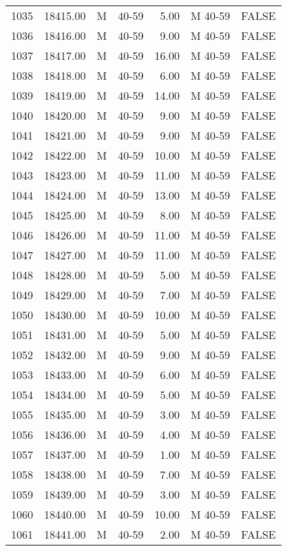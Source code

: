\begin{table}[ht]
\begin{tabular}{rrllrll}
  1035 & 18415.00 & M & 40-59 & 5.00 & M 40-59 & FALSE \\ 
  1036 & 18416.00 & M & 40-59 & 9.00 & M 40-59 & FALSE \\ 
  1037 & 18417.00 & M & 40-59 & 16.00 & M 40-59 & FALSE \\ 
  1038 & 18418.00 & M & 40-59 & 6.00 & M 40-59 & FALSE \\ 
  1039 & 18419.00 & M & 40-59 & 14.00 & M 40-59 & FALSE \\ 
  1040 & 18420.00 & M & 40-59 & 9.00 & M 40-59 & FALSE \\ 
  1041 & 18421.00 & M & 40-59 & 9.00 & M 40-59 & FALSE \\ 
  1042 & 18422.00 & M & 40-59 & 10.00 & M 40-59 & FALSE \\ 
  1043 & 18423.00 & M & 40-59 & 11.00 & M 40-59 & FALSE \\ 
  1044 & 18424.00 & M & 40-59 & 13.00 & M 40-59 & FALSE \\ 
  1045 & 18425.00 & M & 40-59 & 8.00 & M 40-59 & FALSE \\ 
  1046 & 18426.00 & M & 40-59 & 11.00 & M 40-59 & FALSE \\ 
  1047 & 18427.00 & M & 40-59 & 11.00 & M 40-59 & FALSE \\ 
  1048 & 18428.00 & M & 40-59 & 5.00 & M 40-59 & FALSE \\ 
  1049 & 18429.00 & M & 40-59 & 7.00 & M 40-59 & FALSE \\ 
  1050 & 18430.00 & M & 40-59 & 10.00 & M 40-59 & FALSE \\ 
  1051 & 18431.00 & M & 40-59 & 5.00 & M 40-59 & FALSE \\ 
  1052 & 18432.00 & M & 40-59 & 9.00 & M 40-59 & FALSE \\ 
  1053 & 18433.00 & M & 40-59 & 6.00 & M 40-59 & FALSE \\ 
  1054 & 18434.00 & M & 40-59 & 5.00 & M 40-59 & FALSE \\ 
  1055 & 18435.00 & M & 40-59 & 3.00 & M 40-59 & FALSE \\ 
  1056 & 18436.00 & M & 40-59 & 4.00 & M 40-59 & FALSE \\ 
  1057 & 18437.00 & M & 40-59 & 1.00 & M 40-59 & FALSE \\ 
  1058 & 18438.00 & M & 40-59 & 7.00 & M 40-59 & FALSE \\ 
  1059 & 18439.00 & M & 40-59 & 3.00 & M 40-59 & FALSE \\ 
  1060 & 18440.00 & M & 40-59 & 10.00 & M 40-59 & FALSE \\ 
  1061 & 18441.00 & M & 40-59 & 2.00 & M 40-59 & FALSE \\ 

\end{tabular}
\end{table}
